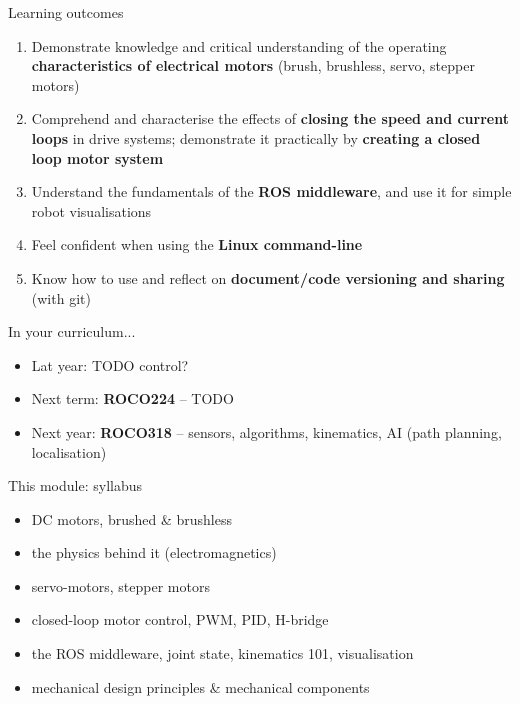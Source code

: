 \documentclass[compress]{beamer}
\begin{document}
\begin{frame}{Learning outcomes}
    \begin{enumerate}
        \item<+-> Demonstrate knowledge and critical understanding of the operating
            \textbf{characteristics of electrical motors} (brush, brushless,
            servo, stepper motors)
        \item<+-> Comprehend and characterise the effects of \textbf{closing the speed and current
            loops} in drive systems; demonstrate it practically by \textbf{creating a
            closed loop motor system}
        \item<+-> Understand the fundamentals of the \textbf{ROS middleware}, and use it for
            simple robot visualisations
        \item<+-> Feel confident when using the \textbf{Linux command-line}
        \item<+-> Know how to use and reflect on \textbf{document/code versioning and
            sharing} (with git)
    \end{enumerate}
\end{frame}

\begin{frame}{In your curriculum...}
    \begin{itemize}
        \item Lat year: TODO control?
        \item Next term: \textbf{ROCO224} -- TODO
        \item Next year: \textbf{ROCO318} -- sensors, algorithms, kinematics, AI (path
            planning, localisation)
    \end{itemize}
\end{frame}

\begin{frame}{This module: syllabus}

\begin{itemize}
    \item<+-> DC motors, brushed \& brushless
    \item<+-> the physics behind it (electromagnetics)
    \item<+-> servo-motors, stepper motors
    \item<+-> closed-loop motor control, PWM, PID, H-bridge
    \item<+-> the ROS middleware, joint state, kinematics 101, visualisation
    \item<+-> mechanical design principles \& mechanical components
\end{itemize}

\end{frame}
\end{document}
